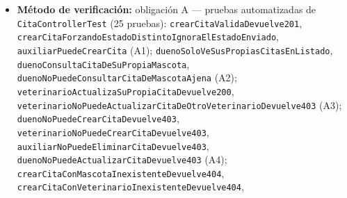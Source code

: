 \documentclass[
  spanish,
]{article}
\begin{document}
\begin{itemize}
\begin{enumerate}
    muestra únicamente citas de sus propias mascotas.
  \item
    \textbf{(B3)} Dado un \texttt{ROLE\_\allowbreak{}ADMIN} o
    \texttt{ROLE\_\allowbreak{}AUXILIAR}, cuando selecciona una fecha libre, entonces
    puede crear una cita para esa fecha desde el calendario.
  \item
    \textbf{(B4)} Dada una cita mostrada en el calendario, cuando se
    selecciona, entonces se abre su detalle con mascota, veterinario,
    fecha, estado y motivo.
  \item
    \textbf{(B5)} La vista cumple el mismo umbral de accesibilidad
    exigido por REQ-NF-018.
  \end{enumerate}
\item
  \textbf{Método de verificación:} obligación A --- pruebas
  automatizadas de \texttt{Cita\allowbreak{}Controller\allowbreak{}Test} (25 pruebas):
  \texttt{crear\allowbreak{}Cita\allowbreak{}Valida\allowbreak{}Devuelve201},
  \texttt{crear\allowbreak{}Cita\allowbreak{}Forzando\allowbreak{}Estado\allowbreak{}Distinto\allowbreak{}Ignora\allowbreak{}El\allowbreak{}Estado\allowbreak{}Enviado},
  \texttt{auxiliar\allowbreak{}Puede\allowbreak{}Crear\allowbreak{}Cita} (A1);
  \texttt{dueno\allowbreak{}Solo\allowbreak{}Ve\allowbreak{}Sus\allowbreak{}Propias\allowbreak{}Citas\allowbreak{}En\allowbreak{}Listado},
  \texttt{dueno\allowbreak{}Consulta\allowbreak{}Cita\allowbreak{}De\allowbreak{}Su\allowbreak{}Propia\allowbreak{}Mascota},
  \texttt{dueno\allowbreak{}No\allowbreak{}Puede\allowbreak{}Consultar\allowbreak{}Cita\allowbreak{}De\allowbreak{}Mascota\allowbreak{}Ajena} (A2);
  \texttt{veterinario\allowbreak{}Actualiza\allowbreak{}Su\allowbreak{}Propia\allowbreak{}Cita\allowbreak{}Devuelve200},
  \texttt{veterinario\allowbreak{}No\allowbreak{}Puede\allowbreak{}Actualizar\allowbreak{}Cita\allowbreak{}De\allowbreak{}Otro\allowbreak{}Veterinario\allowbreak{}Devuelve403}
  (A3); \texttt{dueno\allowbreak{}No\allowbreak{}Puede\allowbreak{}Crear\allowbreak{}Cita\allowbreak{}Devuelve403},
  \texttt{veterinario\allowbreak{}No\allowbreak{}Puede\allowbreak{}Crear\allowbreak{}Cita\allowbreak{}Devuelve403},
  \texttt{auxiliar\allowbreak{}No\allowbreak{}Puede\allowbreak{}Eliminar\allowbreak{}Cita\allowbreak{}Devuelve403},
  \texttt{dueno\allowbreak{}No\allowbreak{}Puede\allowbreak{}Actualizar\allowbreak{}Cita\allowbreak{}Devuelve403} (A4);
  \texttt{crear\allowbreak{}Cita\allowbreak{}Con\allowbreak{}Mascota\allowbreak{}Inexistente\allowbreak{}Devuelve404},
  \texttt{crear\allowbreak{}Cita\allowbreak{}Con\allowbreak{}Veterinario\allowbreak{}Inexistente\allowbreak{}Devuelve404},

\end{itemize}
\end{document}
